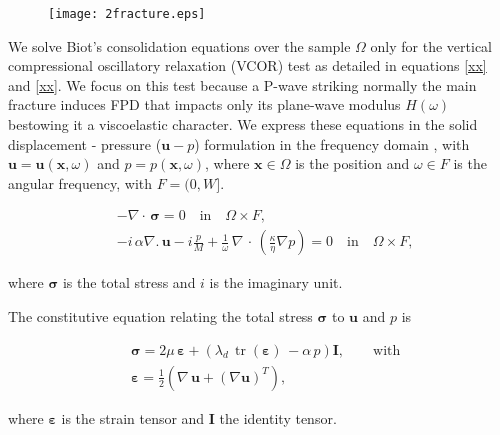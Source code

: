 \documentclass[draft]{agujournal2019}
\DeclareMathOperator{\tr}{tr}
\begin{document}
 \begin{figure}[!ht]
\centering
        \texttt{[image: 2fracture.eps]}
\caption{
}
\label{fig.2}
\end{figure}
We solve Biot's consolidation equations \cite{Biot1941} over the sample $\Omega$ only for the vertical compressional oscillatory relaxation (VCOR) test as detailed in equations
\eqref{xx} and \eqref{xx}. We focus on this test because a P-wave striking normally the main fracture induces FPD that impacts only its plane-wave modulus $H(\omega)$ bestowing it a viscoelastic character.
We express these equations in the solid displacement - pressure ($\bm{u}-p$) formulation in the frequency domain \cite{Quintal2011,Favino2020},  with $\bm{u} = \bm{u}(\bm{x}, \omega)$ and $p = p(\bm{x},\omega)$, where $\bm{x} \in \Omega$ is the position  and $\omega \in F$ is the angular frequency, with $F =(0,W]$. 
\begin{linenomath*}
\begin{equation}\label{Eq.5}
\begin{split}
& - \nabla \cdot \, \bm{\sigma} =0  \quad  \textrm{in} \quad \Omega \times F,  \\
& - i \, \alpha \nabla . \, \bm{u} -i \frac{p}{M} + \frac{1}{\omega} \,\nabla \, \cdot \, \left( \frac{\kappa}{\eta} \nabla p\right)  =0 \quad  \textrm{in} \quad \Omega \times F,
\end{split}
\end{equation}
\end{linenomath*}
where $\bm{\sigma}$ is the total stress and $i$ is the imaginary unit.

The constitutive equation relating the total stress $\bm{\sigma}$ to $\bm{u}$ and $p$ is
\begin{linenomath*}
\begin{equation}\label{Eq.6}
\begin{split}
& \bm{\sigma} =  2\mu \, \bm{\varepsilon} +  \left( \lambda_d \,  \tr( \bm{\varepsilon})\, - \alpha \,p \right) \bm{I}, \qquad \text{with}\\
& \bm{\varepsilon} = \frac{1}{2} \left( \nabla \,\bm{u} + ({\nabla  \bm{u}})^T  \right),
\end{split}
\end{equation}
\end{linenomath*}
where $\bm{\varepsilon}$ is the strain tensor and $\bm{I}$ the identity tensor. 
\end{document}
